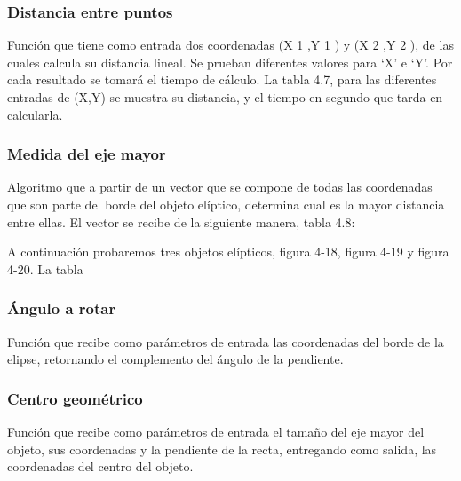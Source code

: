 \subsubsection{Distancia entre puntos}

Función que tiene como entrada dos coordenadas (X 1 ,Y 1 ) y (X 2 ,Y 2 ), de las
cuales
calcula su distancia lineal. Se prueban diferentes valores para ‘X’ e ‘Y’. Por
cada
resultado se tomará el tiempo de cálculo.
La tabla 4.7, para las diferentes entradas de (X,Y) se muestra su distancia, y
el
tiempo en segundo que tarda en calcularla.

\subsubsection{Medida del eje mayor}
Algoritmo que a partir de un vector que se compone de todas las coordenadas
que son parte del borde del objeto elíptico, determina cual es la mayor
distancia
entre ellas. El vector se recibe de la siguiente manera, tabla 4.8:

A continuación probaremos tres objetos elípticos, figura 4-18, figura 4-19 y
figura 4-20. La tabla

\subsubsection{Ángulo a rotar}
Función que recibe como parámetros de entrada las coordenadas del borde de la
elipse, retornando el complemento del ángulo de la pendiente.

\subsubsection{Centro geométrico}
Función que recibe como parámetros de entrada el tamaño del eje mayor del
objeto, sus coordenadas y la pendiente de la recta, entregando como salida, las
coordenadas del centro del objeto.


